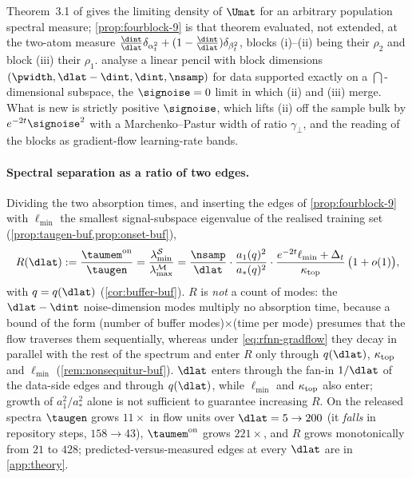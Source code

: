 Theorem~3.1 of \citet{bonnaire2025} gives the limiting density of $\Umat$ for an arbitrary population spectral measure; \cref{prop:fourblock-9} is that theorem evaluated, not extended, at the two-atom measure $\tfrac{\dint}{\dlat}\delta_{\alpha_t^2}+(1-\tfrac{\dint}{\dlat})\delta_{\beta_t^2}$, blocks (i)--(ii) being their $\rho_2$ and block (iii) their $\rho_1$. \citet{george2025dsm} analyse a linear pencil with block dimensions $(\pwidth,\dlat-\dint,\dint,\nsamp)$ for data supported exactly on a $\dint$-dimensional subspace, the $\signoise=0$ limit in which (ii) and (iii) merge. What is new is strictly positive $\signoise$, which lifts (ii) off the sample bulk by $e^{-2t}\signoise^2$ with a Marchenko--Pastur width of ratio $\gamma_\perp$, and the reading of the blocks as gradient-flow learning-rate bands.

\paragraph{Spectral separation as a ratio of two edges.}\label{sec:theory-buffer}\label{prop:buffer-main}
Dividing the two absorption times, and inserting the edges of \cref{prop:fourblock-9} with $\ell_{\min}$ the smallest signal-subspace eigenvalue of the realised training set (\cref{prop:taugen-buf,prop:onset-buf}),
\begin{equation}\label{eq:R-main}
R(\dlat):=\frac{\taumem^{\rm on}}{\taugen}=\frac{\lambda^{\mathcal S}_{\min}}{\lambda^{\mathcal M}_{\max}}
=\frac{\nsamp}{\dlat}\cdot\frac{a_1(q)^2}{a_*(q)^2}\cdot\frac{e^{-2t}\ell_{\min}+\Delta_t}{\kappa_{\rm top}}\,\bigl(1+o(1)\bigr),
\end{equation}
with $q=q(\dlat)$ (\cref{cor:buffer-buf}).\label{cor:buffer-main} $R$ is \emph{not} a count of modes: the $\dlat-\dint$ noise-dimension modes multiply no absorption time, because a bound of the form (number of buffer modes)$\times$(time per mode) presumes that the flow traverses them sequentially, whereas under \eqref{eq:rfnn-gradflow} they decay in parallel with the rest of the spectrum and enter $R$ only through $q(\dlat)$, $\kappa_{\rm top}$ and $\ell_{\min}$ (\cref{rem:nonsequitur-buf}). $\dlat$ enters through the fan-in $1/\dlat$ of the data-side edges and through $q(\dlat)$, while $\ell_{\min}$ and $\kappa_{\rm top}$ also enter; growth of $a_1^2/a_*^2$ alone is not sufficient to guarantee increasing $R$. On the released spectra $\taugen$ grows $11\times$ in flow units over $\dlat=5\to200$ (it \emph{falls} in repository steps, $158\to43$), $\taumem^{\rm on}$ grows $221\times$, and $R$ grows monotonically from $21$ to $428$; predicted-versus-measured edges at every $\dlat$ are in \cref{app:theory}.

